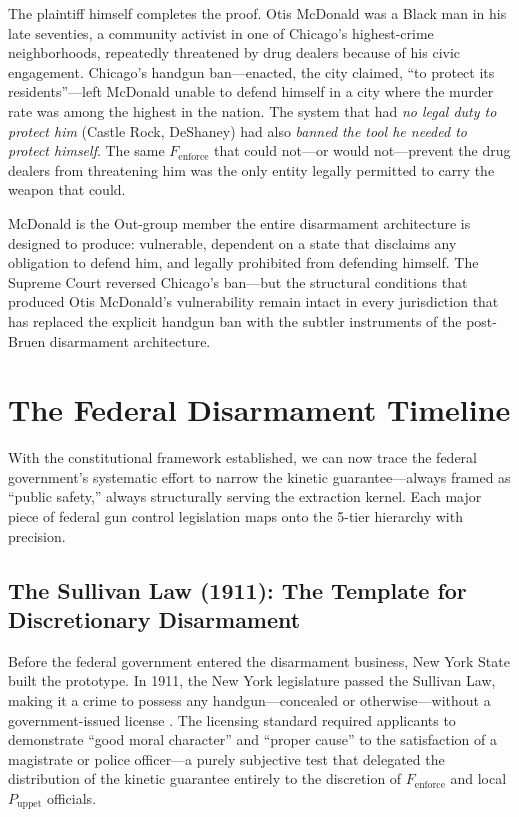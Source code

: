 The plaintiff himself completes the proof. Otis McDonald was a Black man in his late seventies, a community activist in one of Chicago's highest-crime neighborhoods, repeatedly threatened by drug dealers because of his civic engagement. Chicago's handgun ban---enacted, the city claimed, ``to protect its residents''---left McDonald unable to defend himself in a city where the murder rate was among the highest in the nation. The system that had \textit{no legal duty to protect him} (Castle Rock, DeShaney) had also \textit{banned the tool he needed to protect himself}. The same $F_{\text{enforce}}$ that could not---or would not---prevent the drug dealers from threatening him was the only entity legally permitted to carry the weapon that could.

McDonald is the Out-group member the entire disarmament architecture is designed to produce: vulnerable, dependent on a state that disclaims any obligation to defend him, and legally prohibited from defending himself. The Supreme Court reversed Chicago's ban---but the structural conditions that produced Otis McDonald's vulnerability remain intact in every jurisdiction that has replaced the explicit handgun ban with the subtler instruments of the post-Bruen disarmament architecture.

\section{The Federal Disarmament Timeline}

With the constitutional framework established, we can now trace the federal government's systematic effort to narrow the kinetic guarantee---always framed as ``public safety,'' always structurally serving the extraction kernel. Each major piece of federal gun control legislation maps onto the 5-tier hierarchy with precision.

\subsection{The Sullivan Law (1911): The Template for Discretionary Disarmament}
\label{sec:sullivan_law}

Before the federal government entered the disarmament business, New York State built the prototype. In 1911, the New York legislature passed the Sullivan Law, making it a crime to possess any handgun---concealed or otherwise---without a government-issued license \cite{sullivanlaw}. The licensing standard required applicants to demonstrate ``good moral character'' and ``proper cause'' to the satisfaction of a magistrate or police officer---a purely subjective test that delegated the distribution of the kinetic guarantee entirely to the discretion of $F_{\text{enforce}}$ and local $P_{\text{uppet}}$ officials.

